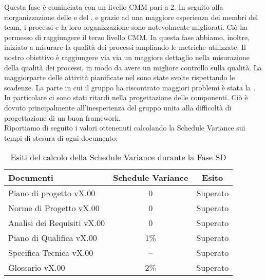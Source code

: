 			Questa fase è cominciata con un livello CMM pari a 2. In seguito alla riorganizzazione delle  e del , e grazie ad una maggiore esperienza dei membri del team, i processi e la loro organizzazione sono notevolmente migliorati. Ciò ha permesso di raggiungere il terzo livello CMM. In questa fase abbiamo, inoltre, iniziato a misurare la qualità dei processi ampliando le metriche utilizzate. Il nostro obiettivo è raggiungere via via un maggiore dettaglio nella misurazione della qualità dei processi, in modo da avere un migliore controllo sulla qualità.
			La maggiorparte delle attività pianificate nel  sono state svolte rispettando le scadenze. La parte in cui il gruppo ha riscontrato maggiori problemi è stata la . In particolare ci sono stati ritardi nella progettazione delle componenti. Ciò è dovuto principalmente all'inesperienza del gruppo unita alla difficoltà di progettazione di un buon framework.\\
			Riportiamo di seguito i valori ottenenuti calcolando la Schedule Variance sui tempi di stesura di ogni documento:
			\begin{table}[H]
					\centering
					\begin{tabu}{| l | c | c |}
							\hline
							Documenti 							& Schedule Variance	& Esito		\\ \hline \hline
							
							Piano di progetto vX.00				& 0 		& Superato  \\ \hline
							Norme di Progetto vX.00 			& 0		& Superato  \\ \hline
							Analisi dei Requisiti vX.00	 	& 0		& Superato  \\ \hline
							Piano di Qualifica vX.00 			& 1\%		& Superato  \\ \hline
							Specifica Tecnica vX.00 			& --		& Superato  \\ \hline
							Glossario vX.00					 	& 2\% 		& Superato  \\ \hline
						\end{tabu}
					\caption{Esiti del calcolo della Schedule Variance durante la Fase SD}
				\end{table}
